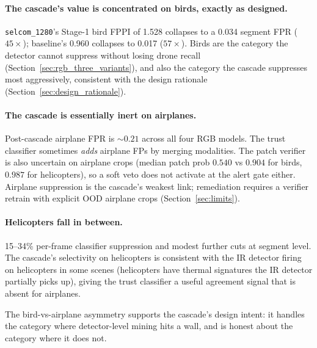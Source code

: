 \paragraph{The cascade's value is concentrated on birds, exactly as designed.}
\texttt{selcom\_1280}'s Stage-1 bird FPPI of 1.528 collapses to a 0.034 segment FPR ($45\times$); baseline's 0.960 collapses to 0.017 ($57\times$). Birds are the category the detector cannot suppress without losing drone recall (Section~\ref{sec:rgb_three_variants}), and also the category the cascade suppresses most aggressively, consistent with the design rationale (Section~\ref{sec:design_rationale}).

\paragraph{The cascade is essentially inert on airplanes.}
Post-cascade airplane FPR is $\sim 0.21$ across all four RGB models. The trust classifier sometimes \emph{adds} airplane FPs by merging modalities. The patch verifier is also uncertain on airplane crops (median patch prob $0.540$ vs $0.904$ for birds, $0.987$ for helicopters), so a soft veto does not activate at the alert gate either. Airplane suppression is the cascade's weakest link; remediation requires a verifier retrain with explicit OOD airplane crops (Section~\ref{sec:limits}).

\paragraph{Helicopters fall in between.}
15--34\% per-frame classifier suppression and modest further cuts at segment level. The cascade's selectivity on helicopters is consistent with the IR detector firing on helicopters in some scenes (helicopters have thermal signatures the IR detector partially picks up), giving the trust classifier a useful agreement signal that is absent for airplanes.

The bird-vs-airplane asymmetry supports the cascade's design intent: it handles the category where detector-level mining hits a wall, and is honest about the category where it does not.


